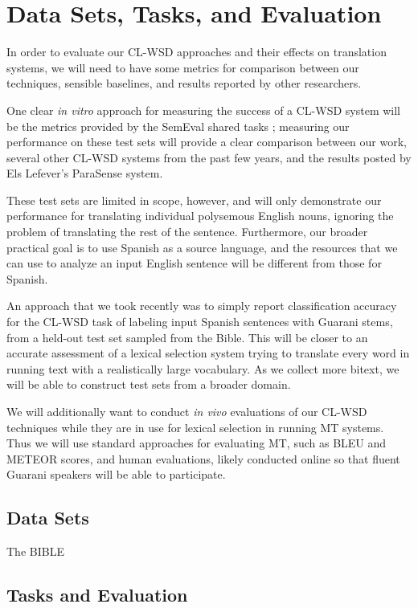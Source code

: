 \chapter{Data Sets, Tasks, and Evaluation}
\label{chap:evaluation}

In order to evaluate our CL-WSD approaches and their effects on translation
systems, we will need to have some metrics for comparison between our
techniques, sensible baselines, and results reported by other researchers.

One clear \emph{in vitro} approach for measuring the success of a CL-WSD system
will be the metrics provided by the SemEval shared tasks
\cite{lefever-hoste:2009:SEW,task10}; measuring our performance on these test
sets will provide a clear comparison between our work, several other CL-WSD
systems from the past few years, and the results posted by Els Lefever's
ParaSense system.

These test sets are limited in scope, however, and will only demonstrate our
performance for translating individual polysemous English nouns, ignoring the
problem of translating the rest of the sentence.
Furthermore, our broader practical goal is to use Spanish as a source language,
and the resources that we can use to analyze an input English sentence will be
different from those for Spanish.

An approach that we took recently \cite{rudnick-gasser:2013:HyTra-2013} was to
simply report classification accuracy for the CL-WSD task of labeling input
Spanish sentences with Guarani stems, from a held-out test set sampled from the
Bible.
This will be closer to an accurate assessment of a lexical selection system
trying to translate every word in running text with a realistically large
vocabulary. As we collect more bitext, we will be able to construct test sets
from a broader domain.

We will additionally want to conduct \emph{in vivo} evaluations of our CL-WSD
techniques while they are in use for lexical selection in running MT systems.
Thus we will use standard approaches for evaluating MT, such as BLEU and METEOR
scores, and human evaluations, likely conducted online so that fluent Guarani
speakers will be able to participate.


\section{Data Sets}
The BIBLE


\section{Tasks and Evaluation}


